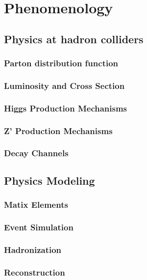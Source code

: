 \chapter{Phenomenology}

\section{Physics at hadron colliders}
\subsection{Parton distribution function}
\subsection{Luminosity and Cross Section}
\subsection{Higgs Production Mechanisms}
\subsection{Z' Production Mechanisms}
\subsection{Decay Channels}

\section{Physics Modeling}
\subsection{Matix Elements}
\subsection{Event Simulation}
\subsection{Hadronization}
\subsection{Reconstruction}
